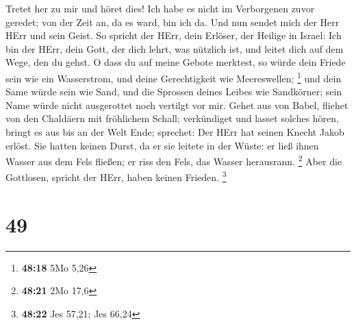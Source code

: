  Tretet her zu mir und höret dies! Ich habe es nicht im
Verborgenen zuvor geredet; von der Zeit an, da es ward, bin ich da. Und
nun sendet mich der Herr HErr und sein Geist.  So spricht
der HErr, dein Erlöser, der Heilige in Israel: Ich bin der HErr, dein
Gott, der dich lehrt, was nützlich ist, und leitet dich auf dem Wege,
den du gehst.  O dass du auf meine Gebote merktest, so
würde dein Friede sein wie ein Wasserstrom, und deine Gerechtigkeit wie
Meereswellen; \footnote{\textbf{48:18} 5Mo 5,26}  und dein
Same würde sein wie Sand, und die Sprossen deines Leibes wie Sandkörner;
sein Name würde nicht ausgerottet noch vertilgt vor mir. 
Gehet aus von Babel, fliehet von den Chaldäern mit fröhlichem Schall;
verkündiget und lasset solches hören, bringt es aus bis an der Welt
Ende; sprechet: Der HErr hat seinen Knecht Jakob erlöst. 
Sie hatten keinen Durst, da er sie leitete in der Wüste: er ließ ihnen
Wasser aus dem Fels fließen; er riss den Fels, das Wasser herausrann.
\footnote{\textbf{48:21} 2Mo 17,6}  Aber die Gottlosen,
spricht der HErr, haben keinen Frieden. \footnote{\textbf{48:22} Jes
  57,21; Jes 66,24}

\hypertarget{section-17}{%
\section{49}\label{section-17}}

